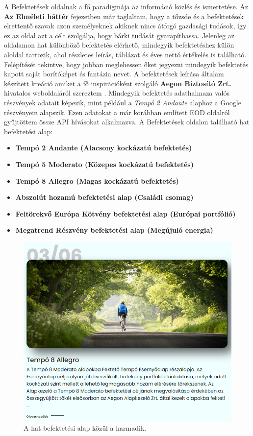 A Befektetések oldalnak a fő paradigmája az információ közlés és ismertetése. Az \textbf{Az Elméleti háttér} fejezetben már taglaltam, hogy a tőzsde és a befektetések elrettentő szavak azon személyeknek akiknek nincs átfogó gazdasági tudások, így ez az oldal azt a célt szolgálja, hogy bárki tudását gyarapíthassa. Jelenleg az oldalamon hat különböző befektetés elérhető, mindegyik befektetéshez külön aloldal tartozik, ahol részletes leírás, táblázat és éves nettó értékelés is található. Felépítését tekintve, hogy jobban meglehessen őket jegyezni mindegyik befektetés kapott saját borítóképet és fantázia nevet. A befektetések leírása általam készített kreáció amiket a fő inspirációként szolgáló \textbf{Aegon Biztosító Zrt.} hivatalos weboldaláról szereztem \cite{Aegon}. Mindegyik befektetés adathalmaza valós részvények adatait képezik, mint például a \emph{Tempó 2 Andante} alaphoz a Google részvényein alapszik. Ezen adatokat a már korábban említett EOD oldalról gyűjtöttem össze API hívásokat alkalmazva. \cite{eod} 
A Befektetések oldalon található hat befektetési alap:
\begin{itemize}
\item \textbf{Tempó 2 Andante (Alacsony kockázatú befektetés)}
\item \textbf{Tempó 5 Moderato (Közepes kockázatú befektetés)}
\item \textbf{Tempó 8 Allegro (Magas kockázatú befektetés)}
\item \textbf{Abszolút hozamú befektetési alap (Családi csomag)}
\item \textbf{Feltörekvő Európa Kötvény befektetési alap (Európai portfólió)}
\item \textbf{Megatrend Részvény befektetési alap (Megújuló energia)} \cite{Aegon}
\end{itemize}

\begin{figure}[h]
\centering
\includegraphics[scale=0.5]{images/invest.png}
\caption{A hat befektetési alap közül a harmadik.}
\end{figure}

